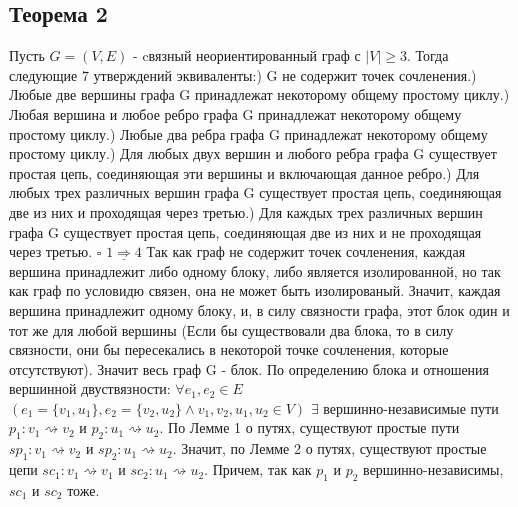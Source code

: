 \documentclass{article}
\begin{document}
\subsection {Теорема 2}
Пусть \(G = (V, E)\) - cвязный неориентированный граф с \(|V| \geq 3\). Тогда следующие 7 утверждений эквиваленты:) G не содержит точек сочленения.) Любые две вершины графа G принадлежат некоторому общему простому циклу.) Любая вершина и любое ребро графа G принадлежат некоторому общему простому циклу.) Любые два ребра графа G принадлежат некоторому общему простому циклу.) Для любых двух вершин и любого ребра графа G существует простая цепь, соединяющая эти вершины и включающая данное ребро.) Для любых трех различных вершин графа G существует простая цепь, соединяющая две из них и проходящая через третью.) Для каждых трех различных вершин графа G существует простая цепь, соединяющая две из них и не проходящая через третью.\newline\newline
\(\square\) \tab \(\underline{1 \Rightarrow 4}\)\newline
\tab\tab Так как граф не содержит точек сочленения, каждая вершина принадлежит либо одному блоку, либо является изолированной, но так как граф по условидю связен, она не может быть изолированый. Значит, каждая вершина принадлежит одному блоку, и, в силу связности графа, этот блок один и тот же для любой вершины (Если бы существовали два блока, то в силу связности, они бы пересекались в некоторой точке сочленения, которые отсутствуют). Значит весь граф G - блок.\newline
\tab\tab По определению блока и отношения вершинной двуствязности: \(\forall e_1, e_2 \in E\) \((e_1 = \{v_1, u_1\}, e_2 = \{v_2, u_2\} \wedge v_1, v_2, u_1, u_2 \in V)\) \(\exists\) вершинно-независимые пути \(p_1: v_1 \rightsquigarrow v_2\) и \(p_2: u_1 \rightsquigarrow u_2\). По Лемме 1 о путях, существуют простые пути \(sp_1: v_1 \rightsquigarrow v_2\) и \(sp_2: u_1 \rightsquigarrow u_2\). Значит, по Лемме 2 о путях, существуют простые цепи \(sc_1: v_1 \rightsquigarrow v_1\) и \(sc_2: u_1 \rightsquigarrow u_2\). Причем, так как \(p_1\) и \(p_2\) вершинно-независимы, \(sc_1\) и \(sc_2\) тоже. \newline
\end{document}

